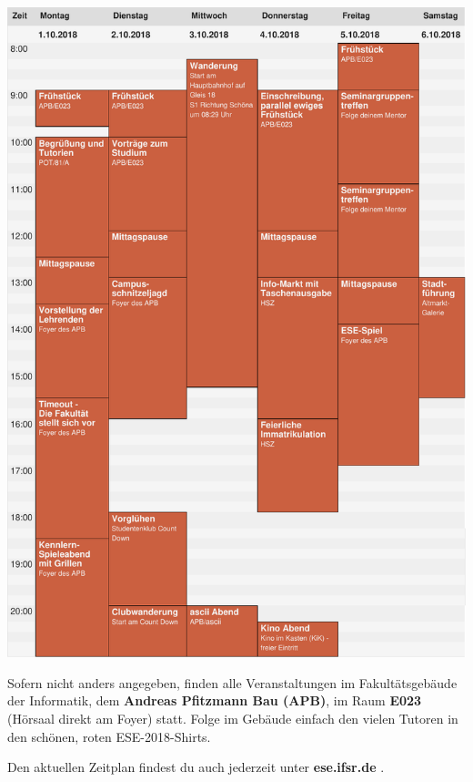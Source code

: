 \begin{center}
  \vspace*{-6.5em}
  \includegraphics[height=.77\dimen108,keepaspectratio]{img/zeitplan.pdf}%

  \small
  \vfill
  \enlargethispage{3em}

  Sofern nicht anders angegeben, finden alle Veranstaltungen im Fakultätsgebäude der Informatik, dem
  \textbf{Andreas Pfitzmann Bau (APB)}, im Raum \textbf{E023} (Hörsaal direkt am Foyer) statt.
  Folge im Gebäude einfach den vielen Tutoren in den schönen, roten ESE-2018-Shirts.

  Den aktuellen Zeitplan findest du auch jederzeit unter \textbf{ese.ifsr.de} .
\end{center}
